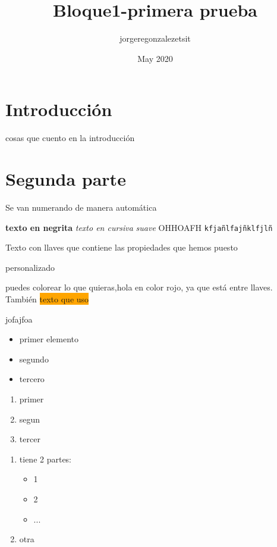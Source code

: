 \documentclass[11]{article} %
\title{Bloque1-primera prueba}
\author{jorgeregonzalezetsit }
\date{May 2020}
\begin{document}
\maketitle

\section{Introducción}
cosas que cuento en la introducción

\section{Segunda parte}
Se van numerando de manera automática

\textbf{texto en negrita} \textit{texto en cursiva} \textsl{suave}
\uppercase{ohhoafh} \texttt{kfjañlfajñklfjlñ}


{\small Texto con llaves que contiene las propiedades que hemos puesto}

{\fontsize{56}{60}\selectfont personalizado}


puedes colorear lo que quieras,{\color{red}\huge hola en color rojo}, ya que está entre llaves. También {\colorbox{orange}{texto que uso}}

{\color{rojo_guay} jofajfoa}



\begin{itemize}
    \item primer elemento
    \item segundo
    \item tercero
\end{itemize}

{\color{rojo_guay}
\begin{enumerate}
    \item primer
    \item segun
    \item tercer
\end{enumerate}
}

\begin{enumerate}
    \item tiene 2 partes:
    \begin{itemize}
        \item 1
        \item 2
        \item ...
    \end{itemize}
    \item otra
\end{enumerate}
\end{document}
